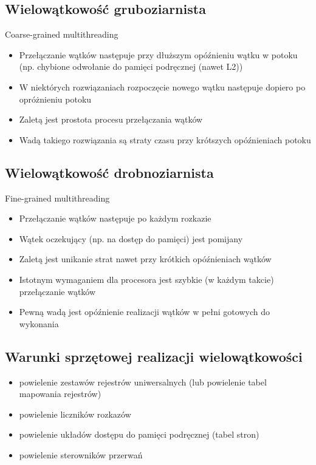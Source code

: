 \documentclass[a4paper,twoside]{article}
\begin{document}
		\subsection*{Wielowątkowość gruboziarnista}
		Coarse-grained multithreading
		\begin{itemize}
			\item Przełączanie wątków następuje przy dłuższym opóźnieniu wątku w potoku (np. chybione odwołanie do pamięci podręcznej (nawet L2))
			\item W niektórych rozwiązaniach rozpoczęcie nowego wątku następuje dopiero po opróżnieniu potoku
			\item Zaletą jest prostota procesu przełączania wątków
			\item Wadą takiego rozwiązania są straty czasu przy krótszych opóźnieniach potoku
		\end{itemize}
		\subsection*{Wielowątkowość drobnoziarnista}
		Fine-grained multithreading
		\begin{itemize}
			\item Przełączanie wątków następuje po każdym rozkazie
			\item Wątek oczekujący (np. na dostęp do pamięci) jest pomijany
			\item Zaletą jest unikanie strat nawet przy krótkich opóźnieniach wątków
			\item Istotnym wymaganiem dla procesora jest szybkie (w każdym takcie) przełączanie wątków
			\item Pewną wadą jest opóźnienie realizacji wątków w pełni gotowych do wykonania
		\end{itemize}
		\subsection*{Warunki sprzętowej realizacji wielowątkowości}
		\begin{itemize}
			\item powielenie zestawów rejestrów uniwersalnych (lub powielenie tabel mapowania rejestrów)
			\item powielenie liczników rozkazów
			\item powielenie układów dostępu do pamięci podręcznej (tabel stron)
			\item powielenie sterowników przerwań
		\end{itemize}
\end{document}
